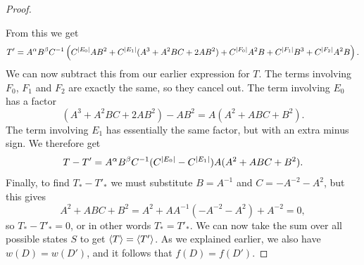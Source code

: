 \documentclass[reqno]{amsart}
\theoremstyle{definition}
\begin{document}
\begin{proof}
\begin{center}
 \end{center}
 From this we get 
 \[ T' = A^\alpha B^\beta C^{-1}\left(
      C^{|E_0|}AB^2 + 
      C^{|E_1|}(A^3+A^2BC+2AB^2) + 
      C^{|F_0|}A^2B + 
      C^{|F_1|}B^3 + 
      C^{|F_2|}A^2B
      \right).
 \]
 We can now subtract this from our earlier expression for $T$.  The
 terms involving $F_0$, $F_1$ and $F_2$ are exactly the same, so they
 cancel out.  The term involving $E_0$ has a factor 
 \[ (A^3+A^2BC+2AB^2) - AB^2 = A(A^2+ABC+B^2). \]
 The term involving $E_1$ has essentially the same factor, but with an
 extra minus sign.  We therefore get 
 \[ T-T' = A^\alpha B^\beta C^{-1}(C^{|E_0|}-C^{|E_1|})A(A^2+ABC+B^2). \]
 Finally, to find $T_*-T'_*$ we must substitute $B=A^{-1}$ and
 $C=-A^{-2}-A^2$, but this gives
 \[ A^2+ABC+B^2 = A^2+AA^{-1}(-A^{-2}-A^2)+A^{-2} =0, \]
 so $T_*-T'_*=0$, or in other words $T_*=T'_*$.  We can now take the
 sum over all possible states $S$ to get $\langle T\rangle=\langle T'\rangle$.  As we
 explained earlier, we also have $w(D)=w(D')$, and it follows that
 $f(D)=f(D')$. 
\end{proof}
\end{document}
